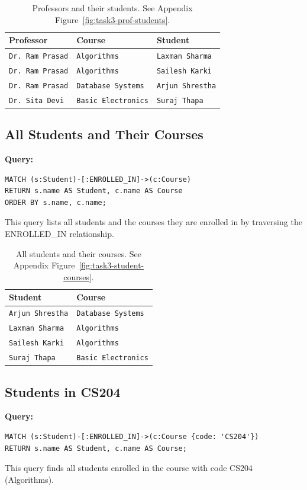\begin{table}[H]
  \centering
  \caption{Professors and their students. See Appendix Figure~\ref{fig:task3-prof-students}.}
  \begin{tabular}{lll}
    \textbf{Professor} & \textbf{Course} & \textbf{Student} \\
    \hline
    \texttt{Dr. Ram Prasad} & \texttt{Algorithms} & \texttt{Laxman Sharma} \\
    \texttt{Dr. Ram Prasad} & \texttt{Algorithms} & \texttt{Sailesh Karki} \\
    \texttt{Dr. Ram Prasad} & \texttt{Database Systems} & \texttt{Arjun Shrestha} \\
    \texttt{Dr. Sita Devi} & \texttt{Basic Electronics} & \texttt{Suraj Thapa} \\
  \end{tabular}
\end{table}

\subsection{All Students and Their Courses}
\textbf{Query:}
\begin{verbatim}
MATCH (s:Student)-[:ENROLLED_IN]->(c:Course)
RETURN s.name AS Student, c.name AS Course
ORDER BY s.name, c.name;
\end{verbatim}
This query lists all students and the courses they are enrolled in by traversing the ENROLLED\_IN relationship.

\begin{table}[H]
  \centering
  \caption{All students and their courses. See Appendix Figure~\ref{fig:task3-student-courses}.}
  \begin{tabular}{ll}
    \textbf{Student} & \textbf{Course} \\
    \hline
    \texttt{Arjun Shrestha} & \texttt{Database Systems} \\
    \texttt{Laxman Sharma} & \texttt{Algorithms} \\
    \texttt{Sailesh Karki} & \texttt{Algorithms} \\
    \texttt{Suraj Thapa} & \texttt{Basic Electronics} \\
  \end{tabular}
\end{table}

\subsection{Students in CS204}
\textbf{Query:}
\begin{verbatim}
MATCH (s:Student)-[:ENROLLED_IN]->(c:Course {code: 'CS204'})
RETURN s.name AS Student, c.name AS Course;
\end{verbatim}
This query finds all students enrolled in the course with code CS204 (Algorithms).

